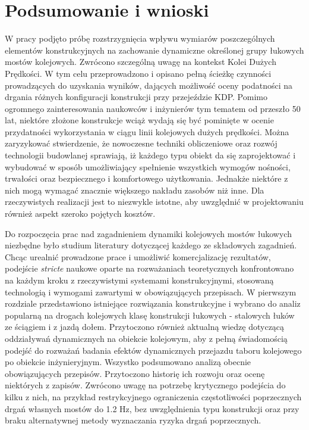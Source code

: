 \chapter*{Podsumowanie i wnioski}

W pracy podjęto próbę rozstrzygnięcia wpływu wymiarów poszczególnych elementów konstrukcyjnych na zachowanie dynamiczne określonej grupy łukowych mostów kolejowych. Zwrócono szczególną uwagę na kontekst Kolei Dużych Prędkości. W tym celu przeprowadzono i opisano pełną ścieżkę czynności prowadzących do uzyskania wyników, dających możliwość oceny podatności na drgania różnych konfiguracji konstrukcji przy przejeździe KDP. Pomimo ogromnego zainteresowania naukowców i inżynierów tym tematem od przeszło 50 lat, niektóre złożone konstrukcje wciąż wydają się być pominięte w ocenie przydatności wykorzystania w ciągu linii kolejowych dużych prędkości. Można zaryzykować stwierdzenie, że nowoczesne techniki obliczeniowe oraz rozwój technologii budowlanej sprawiają, iż każdego typu obiekt da się zaprojektować i wybudować w sposób umożliwiający spełnienie wszystkich wymogów nośności, trwałości oraz bezpiecznego i komfortowego użytkowania. Jednakże niektóre z nich mogą wymagać znacznie większego nakładu zasobów niż inne. Dla rzeczywistych realizacji jest to niezwykle istotne, aby uwzględnić w projektowaniu również aspekt szeroko pojętych kosztów.

Do rozpoczęcia prac nad zagadnieniem dynamiki kolejowych mostów łukowych niezbędne było studium literatury dotyczącej każdego ze składowych zagadnień. Chcąc urealnić prowadzone prace i umożliwić komercjalizację rezultatów, podejście \textit{stricte} naukowe oparte na rozważaniach teoretycznych konfrontowano na każdym kroku z rzeczywistymi systemami konstrukcyjnymi, stosowaną technologią i wymogami zawartymi w obowiązujących przepisach. W pierwszym rozdziale przedstawiono istniejące rozwiązania konstrukcyjne i wybrano do analiz popularną na drogach kolejowych klasę konstrukcji łukowych - stalowych łuków ze ściągiem i z jazdą dołem. Przytoczono również aktualną wiedzę dotyczącą oddziaływań dynamicznych na obiekcie kolejowym, aby z pełną świadomością podejść do rozważań badania efektów dynamicznych przejazdu taboru kolejowego po obiekcie inżynieryjnym. Wszystko podsumowano analizą obecnie obowiązujących przepisów. Przytoczono historię ich rozwoju oraz ocenę niektórych z zapisów. Zwrócono uwagę na potrzebę krytycznego podejścia do kilku z nich, na przykład restrykcyjnego ograniczenia częstotliwości poprzecznych drgań własnych mostów do 1.2 Hz, bez uwzględnienia typu konstrukcji oraz przy braku alternatywnej metody wyznaczania ryzyka drgań poprzecznych.

